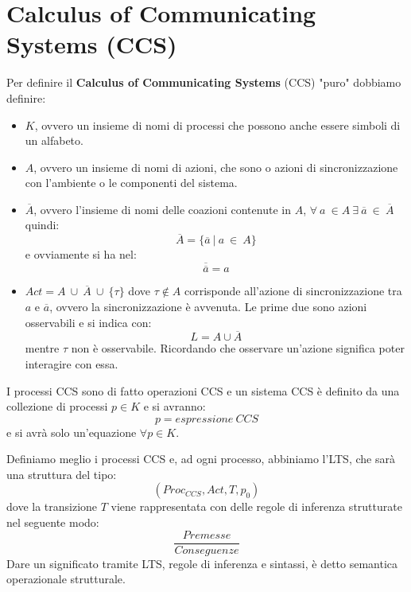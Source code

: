 \section{Calculus of Communicating Systems (CCS)}
\begin{definizione}
    Per definire il \textbf{Calculus of Communicating Systems} (CCS) "puro" dobbiamo definire:
    \begin{itemize}
        \item  $K$, ovvero un insieme di nomi di processi che possono anche essere simboli di un alfabeto.
        \item  $A$, ovvero un insieme di nomi di azioni, che sono o azioni di sincronizzazione con l'ambiente o le componenti del sistema.
        \item $\overline{A}$, ovvero l'insieme di nomi delle coazioni contenute in $A$, $\forall \ a \ \in A \ \exists \ \overline{a} \ \in \ \overline{A}$ quindi: $$\overline{A} = \{\overline{a} \ | \ a \ \in \ A\}$$ e ovviamente si ha nel: $$\overline{\overline{a}} = a$$ 
        \item $Act = A \ \cup  \ \overline{A} \ \cup \ \{\tau\}$ dove $\tau \notin A$ corrisponde all'azione di sincronizzazione tra $a$ e $\overline{a}$, ovvero la sincronizzazione è avvenuta. Le prime due sono azioni osservabili e si indica con: $$L = A \cup \overline{A}$$ mentre $\tau$ non è osservabile. Ricordando che osservare un'azione significa poter interagire con essa.
    \end{itemize}
\end{definizione}
\begin{definizione}
    I processi CCS sono di fatto operazioni CCS e un sistema CCS è definito da una collezione di processi $p \in K$ e si avranno: $$p = espressione \ CCS$$ e si avrà solo un'equazione $\forall p \in K$.
\end{definizione}
Definiamo meglio i processi CCS e, ad ogni processo, abbiniamo l'LTS, che sarà una struttura del tipo: $$(Proc_{CCS}, Act, T, p_0)$$ dove la transizione $T$ viene rappresentata con delle regole di inferenza strutturate nel seguente modo: $$\frac{Premesse}{Conseguenze}$$ Dare un significato tramite LTS, regole di inferenza e sintassi, è detto semantica operazionale strutturale.

